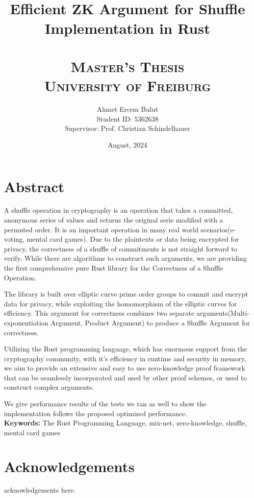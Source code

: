 \documentclass[12pt,a4paper]{report}
\title{
    \HRule \\[0.4cm]
    {\huge \bfseries  Efficient ZK Argument for Shuffle Implementation in Rust \\[0.4cm]}
    \HRule \\[1.5cm]
    \textsc{\Large Master's Thesis}\\[0.5cm]
    \textsc{\large University of Freiburg}\\[0.5cm]
}
\author{
    \Large Ahmet Ercem Bulut\\
    \Large Student ID: 5362638\\
    \Large Supervisor: Prof. Christian Schindelhauer
}
\date{August, 2024}
\begin{document}
\maketitle
\thispagestyle{empty}
\newpage

\chapter*{Abstract}
A shuffle operation in cryptography is an operation that takes a committed, anonymous series of values and returns the original serie modified with a permuted order. 
It is an important operation in many real world scenarios(e-voting, mental card games).
Due to the plaintexts or data being encrypted for privacy, the correctness of a shuffle of commitments is not straight 
forward to verify. While there are algorithms to construct such arguments, we are providing the first comprehensive 
pure Rust library for the Correctness of a Shuffle Operation.\par
The library is built over elliptic curve prime order groups 
to commit and encrypt data for privacy, while exploiting the homomorphism of the elliptic curves for efficiency.
This argument for correctness combines two separate arguments(Multi-exponentiation Argument, Product Argument) to produce a Shuffle Argument for correctness.\par 
Utilizing the Rust programming language, which has enormous support from the cryptography community, with it’s efficiency in runtime and security in memory, 
we aim to provide an extensive and easy to use zero-knowledge proof
framework that can be seamlessly incorporated and used by other proof schemes, or used to construct complex arguments.\par
We give performance results of the tests we ran as well to show the implementation follows the proposed optimized performance.\\
\textbf{Keywords:} The Rust Programming Language, mix-net, zero-knowledge, shuffle, mental card games

\newpage

\chapter*{Acknowledgements}
acknowledgements here.

\newpage
\end{document}

